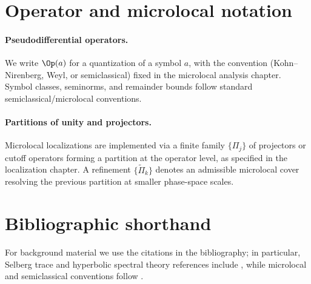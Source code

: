 \section*{Operator and microlocal notation}

\paragraph{Pseudodifferential operators.}
We write $\Op(a)$ for a quantization of a symbol $a$, with the convention (Kohn--Nirenberg, Weyl, or semiclassical) fixed in the microlocal analysis chapter.
Symbol classes, seminorms, and remainder bounds follow standard semiclassical/microlocal conventions.

\paragraph{Partitions of unity and projectors.}
Microlocal localizations are implemented via a finite family $\{\Pi_j\}$ of projectors or cutoff operators forming a partition at the operator level, as specified in the localization chapter.
A refinement $\{\widetilde{\Pi}_k\}$ denotes an admissible microlocal cover resolving the previous partition at smaller phase-space scales.

\section*{Bibliographic shorthand}

For background material we use the citations in the bibliography; in particular,
Selberg trace and hyperbolic spectral theory references include \cite{Hejhal1983,Buser1992,Iwaniec2002},
while microlocal and semiclassical conventions follow \cite{Zworski2012,DyatlovZworski2019,Sogge2014}.

